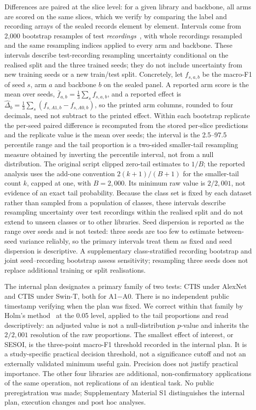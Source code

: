 Differences are paired at the slice level: for a given library and backbone, all arms are
scored on the same slices, which we verify by comparing the label and recording arrays of the
sealed records element by element. Intervals come from 2{,}000 bootstrap resamples of test
\emph{recordings}~\cite{field2007boot}, with whole recordings resampled and the same resampling indices applied to
every arm and backbone. These intervals describe test-recording resampling uncertainty
conditional on the realised split and the three trained seeds; they do not include uncertainty
from new training seeds or a new train/test split. Concretely, let $f_{s,a,b}$ be the macro-F1 of seed $s$, arm $a$ and
backbone $b$ on the sealed panel. A reported arm score is the mean over seeds,
$\bar f_{a,b} = \frac{1}{3}\sum_s f_{s,a,b}$, and a reported effect is
$\hat\Delta_b = \frac{1}{3}\sum_s (f_{s,A1,b} - f_{s,A0,b})$, so the printed arm columns,
rounded to four decimals, need not subtract to the printed effect. Within each bootstrap
replicate the per-seed paired difference is recomputed from the stored per-slice predictions and
the replicate value is the mean over seeds; the interval is the 2.5--97.5 percentile range and
the tail proportion is a two-sided smaller-tail resampling measure obtained by inverting the
percentile interval, not from a null distribution. The original script clipped
zero-tail estimates to $1/B$; the reported analysis uses the add-one convention
$2(k+1)/(B+1)$ for the smaller-tail count $k$, capped at one, with $B=2{,}000$.
Its minimum raw value is $2/2{,}001$, not evidence of an exact tail probability. Because the class set is fixed by each dataset rather than sampled from a population of classes, these intervals describe resampling uncertainty over test recordings within the realised split and do not extend to unseen classes or to other libraries.
Seed dispersion is reported as the range over
seeds and is not tested: three seeds are too few to estimate between-seed variance reliably,
so the primary intervals treat them as fixed and seed dispersion is descriptive. A supplementary
class-stratified recording bootstrap and joint seed--recording bootstrap assess sensitivity;
resampling three seeds does not replace additional training or split realisations.

The internal plan designates a primary family of two tests: CTIS under AlexNet and CTIS under Swin-T, both for
A1$-$A0. There is no independent public timestamp verifying when the plan was fixed. We
correct within that family by Holm's method~\cite{holm1979} at the 0.05 level, applied to the
tail proportions and read descriptively: an adjusted value is not a null-distribution
$p$-value and inherits the $2/2{,}001$ resolution of the raw proportions. The smallest effect
of interest, or SESOI, is the three-point macro-F1 threshold recorded in the internal plan.
It is a study-specific practical decision threshold, not a significance cutoff and not an
externally validated minimum useful gain. Precision does not justify practical importance.
The other four libraries are additional, non-confirmatory applications of the same operation,
not replications of an identical task. No public preregistration was made; Supplementary
Material S1 distinguishes the internal plan, execution changes and post hoc analyses.


